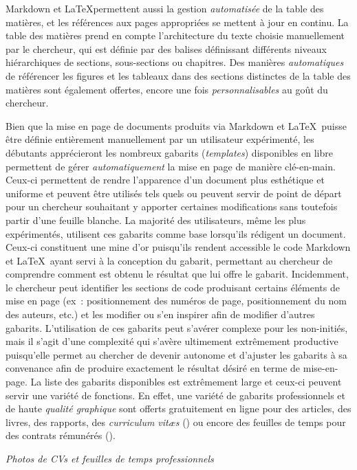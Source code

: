 \documentclass[
  letterpaper,
]{scrbook}
\begin{document}
Markdown et \LaTeX permettent aussi la gestion \emph{automatisée} de la
table des matières, et les références aux pages appropriées se mettent à
jour en continu. La table des matières prend en compte l'architecture du
texte choisie manuellement par le chercheur, qui est définie par des
balises définissant différents niveaux hiérarchiques de sections,
sous-sections ou chapitres. Des manières \emph{automatiques} de
référencer les figures et les tableaux dans des sections distinctes de
la table des matières sont également offertes, encore une fois
\emph{personnalisables} au goût du chercheur.

Bien que la mise en page de documents produits via Markdown et
\LaTeX~puisse être définie entièrement manuellement par un utilisateur
expérimenté, les débutants apprécieront les nombreux gabarits
(\emph{templates}) disponibles en libre permettent de gérer
\emph{automatiquement} la mise en page de manière clé-en-main. Ceux-ci
permettent de rendre l'apparence d'un document plus esthétique et
uniforme et peuvent être utilisés tels quels ou peuvent servir de point
de départ pour un chercheur souhaitant y apporter certaines
modifications sans toutefois partir d'une feuille blanche. La majorité
des utilisateurs, même les plus expérimentés, utilisent ces gabarits
comme base lorsqu'ils rédigent un document. Ceux-ci constituent une mine
d'or puisqu'ils rendent accessible le code Markdown et \LaTeX~ayant
servi à la conception du gabarit, permettant au chercheur de comprendre
comment est obtenu le résultat que lui offre le gabarit. Incidemment, le
chercheur peut identifier les sections de code produisant certains
éléments de mise en page (ex~: positionnement des numéros de page,
positionnement du nom des auteurs, etc.) et les modifier ou s'en
inspirer afin de modifier d'autres gabarits. L'utilisation de ces
gabarits peut s'avérer complexe pour les non-initiés, mais il s'agit
d'une complexité qui s'avère ultimement extrêmement productive
puisqu'elle permet au chercher de devenir autonome et d'ajuster les
gabarits à sa convenance afin de produire exactement le résultat désiré
en terme de mise-en-page. La liste des gabarits disponibles est
extrêmement large et ceux-ci peuvent servir une variété de fonctions. En
effet, une variété de gabarits professionnels et de haute \emph{qualité
graphique} sont offerts gratuitement en ligne pour des articles, des
livres, des rapports, des \emph{curriculum vitæs} () ou encore des
feuilles de temps pour des contrats rémunérés ().

\emph{Photos de CVs et feuilles de temps professionnels}
\end{document}

